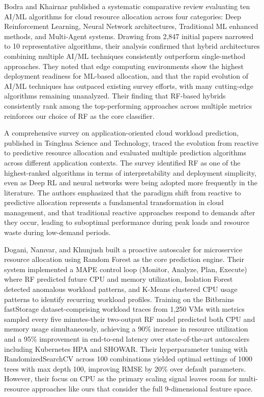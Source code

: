 \documentclass[conference]{IEEEtran}
\begin{document}
Bodra and Khairnar published a systematic comparative review evaluating ten AI/ML algorithms for cloud resource allocation across four categories: Deep Reinforcement Learning, Neural Network architectures, Traditional ML enhanced methods, and Multi-Agent systems. Drawing from 2,847 initial papers narrowed to 10 representative algorithms, their analysis confirmed that hybrid architectures combining multiple AI/ML techniques consistently outperform single-method approaches. They noted that edge computing environments show the highest deployment readiness for ML-based allocation, and that the rapid evolution of AI/ML techniques has outpaced existing survey efforts, with many cutting-edge algorithms remaining unanalyzed. Their finding that RF-based hybrids consistently rank among the top-performing approaches across multiple metrics reinforces our choice of RF as the core classifier.~\cite{Ref6}

A comprehensive survey on application-oriented cloud workload prediction, published in Tsinghua Science and Technology, traced the evolution from reactive to predictive resource allocation and evaluated multiple prediction algorithms across different application contexts. The survey identified RF as one of the highest-ranked algorithms in terms of interpretability and deployment simplicity, even as Deep RL and neural networks were being adopted more frequently in the literature. The authors emphasized that the paradigm shift from reactive to predictive allocation represents a fundamental transformation in cloud management, and that traditional reactive approaches respond to demands after they occur, leading to suboptimal performance during peak loads and resource waste during low-demand periods.~\cite{Ref7}

Dogani, Namvar, and Khunjush built a proactive autoscaler for microservice resource allocation using Random Forest as the core prediction engine. Their system implemented a MAPE control loop (Monitor, Analyze, Plan, Execute) where RF predicted future CPU and memory utilization, Isolation Forest detected anomalous workload patterns, and K-Means clustered CPU usage patterns to identify recurring workload profiles. Training on the Bitbrains fastStorage dataset-comprising workload traces from 1,250 VMs with metrics sampled every five minutes-their two-output RF model predicted both CPU and memory usage simultaneously, achieving a 90\% increase in resource utilization and a 95\% improvement in end-to-end latency over state-of-the-art autoscalers including Kubernetes HPA and SHOWAR. Their hyperparameter tuning with RandomizedSearchCV across 100 combinations yielded optimal settings of 1000 trees with max depth 100, improving RMSE by 20\% over default parameters. However, their focus on CPU as the primary scaling signal leaves room for multi-resource approaches like ours that consider the full 9-dimensional feature space.~\cite{Ref8}
\end{document}
